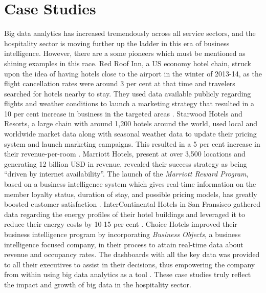 \documentclass[sigconf]{acmart}
\begin{document}
\section{Case Studies}
Big data analytics has increased tremendously across all service sectors, and the hospitality sector is moving further up the ladder in this era of business intelligence. However, there are a some pioneers which must be mentioned as shining examples in this race. Red Roof Inn, a US economy hotel chain, struck upon the idea of having hotels close to the airport in the winter of 2013-14, as the flight cancellation rates were around 3 per cent at that time and travelers searched for hotels nearby to stay. They used data available publicly regarding flights and weather conditions to launch a marketing strategy that resulted in a 10 per cent increase in business in the targeted areas \cite {bmarr06}. Starwood Hotels and Resorts, a large chain with around 1,200 hotels around the world, used local and worldwide market data along with seasonal weather data to update their pricing system and launch marketing campaigns. This resulted in a 5 per cent increase in their revenue-per-room \cite {bmarr06}. Marriott Hotels, present at over 3,500 locations and generating 12 billion USD in revenue, revealed their success strategy as being ``driven by internet availability''. The launch of the {\em Marriott Reward Program}, based on a business intelligence system which gives real-time information on the member loyalty status, duration of stay, and possible pricing models, has greatly boosted customer satisfaction \cite {kortefrolick03}. InterContinental Hotels in San Fransisco gathered data regarding the energy profiles of their hotel buildings and leveraged it to reduce their energy costs by 10-15 per cent \cite {hotelanalytics14}. Choice Hotels improved their business intelligence program by incorporating {\em Business Objects}, a business intelligence focused company, in their process to attain real-time data about revenue and occupancy rates. The dashboards with all the key data was provided to all their executives to assist in their decisions, thus empowering the company from within using big data analytics as a tool \cite {kortefrolick03}. These case studies truly reflect the impact and growth of big data in the hospitality sector.
\end{document}
